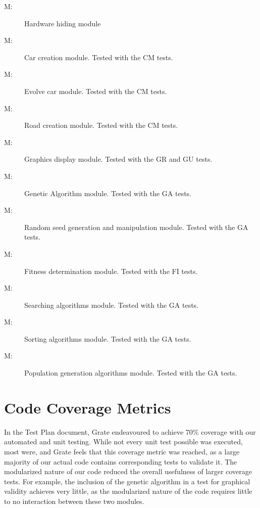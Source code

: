 \documentclass[12pt, titlepage]{article}
\newcounter{mnum}
\newcommand{\mthemnum}{M\themnum}
\begin{document}
\begin{description}
\item [ \mthemnum \label{mHardware}:] Hardware hiding 
module
\item [ \mthemnum \label{mCreateCar}:]  Car creation module. Tested with the CM tests.
\item [ \mthemnum \label{mEvolveCar}:] Evolve car module. Tested with the CM tests.
\item [ \mthemnum \label{mCreateRoad}:] Road creation 
module. Tested with the CM tests.
\item [ \mthemnum \label{mGraphicsDisplay}:] Graphics 
display module. Tested with the GR and GU tests.
\item [ \mthemnum \label{mGeneticAlgorithm}:] Genetic 
Algorithm module. Tested with the GA tests.
\item [ \mthemnum \label{mRandomSeed}:] Random seed 
generation and manipulation module. Tested with the GA tests.
\item [ \mthemnum \label{mFitness}:] Fitness determination 
module. Tested with the FI tests.
\item [ \mthemnum \label{mSearching}:] Searching algorithms 
module. Tested with the GA tests.
\item [ \mthemnum \label{mSorting}:] Sorting algorithms 
module. Tested with the GA tests.
\item [ \mthemnum \label{mPopulationGeneration}:] 
Population generation algorithms module. Tested with the GA tests.
\end{description}


\section{Code Coverage Metrics}

In the Test Plan document, Grate endeavoured to achieve 70\% coverage with our automated and unit testing. While not every unit test possible was executed, most were, and Grate feels that this coverage metric was reached, as a large majority of our actual code contains corresponding tests to validate it. The modularized nature of our code reduced the overall usefulness of larger coverage tests. For example, the inclusion of the genetic algorithm in a test for graphical validity achieves very little, as the modularized nature of the code requires little to no interaction between these two modules.
\end{document}

